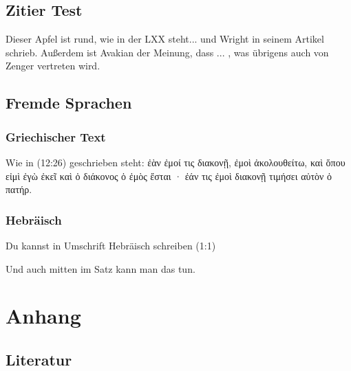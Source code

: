 \documentclass[12pt,oneside,a4paper]{scrreprt}
\begin{document}
\section{Zitier Test}
\glqq Dieser Apfel ist rund\grqq, wie in der LXX steht\autocite[Vgl. Gen 1,1 in ][]{LXX}... und Wright in seinem Artikel schrieb. \autocite{Wright:2015tp}
Außerdem ist Avakian der Meinung, dass ... \autocite{Avakian:2012tz}, was übrigens auch von Zenger vertreten wird. \autocite[Vgl.][45]{ZengerPs}

\section{Fremde Sprachen}
\subsection{Griechischer Text}
Wie in (12:26) geschrieben steht: ἐὰν ἐμοί τις διακονῇ, ἐμοὶ ἀκολουθείτω, καὶ ὅπου εἰμὶ ἐγὼ ἐκεῖ καὶ ὁ διάκονος ὁ ἐμὸς ἔσται · ἐάν τις ἐμοὶ διακονῇ τιμήσει αὐτὸν ὁ πατήρ.\autocite{NA:28}
\subsection{Hebräisch}
Du kannst in Umschrift Hebräisch schreiben
(1:1) 


Und auch mitten im Satz  kann man das tun.


\chapter{Anhang}

\section{Literatur}
\printbibliography[keyword=Quelle,heading=quelle] 
\printbibliography[keyword=Kommentar,heading=kommentar]
\printbibliography[keyword=Lexikon,heading=lexikon]
\printbibliography[notkeyword=Quelle,notkeyword=Lexikon,notkeyword=Kommentar,heading=lit] 
\end{document}
